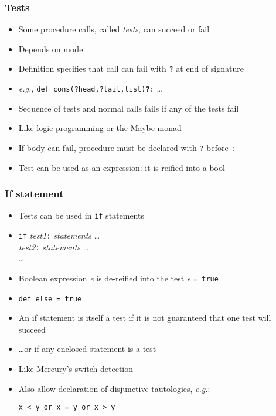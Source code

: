 \documentclass[12pt]{beamer}
\begin{document}
\begin{frame}
\frametitle{Tests}
\begin{itemize}
\item Some procedure calls, called \emph{tests}, can succeed or fail
\item Depends on mode
\item Definition specifies that call can fail with \texttt{?} at end
  of signature
\item \emph{e.g.,} \texttt{def cons(?head,?tail,list)\textbf{?}:} \ldots
\item Sequence of tests and normal calls fails if any of the tests fail
\item Like logic programming or the Maybe monad
\item If body can fail, procedure must be declared with \texttt{?}
  before \texttt{:}
\item Test can be used as an expression:  it is reified into a bool
\end{itemize}
\end{frame}


\begin{frame}
\frametitle{If statement}
\begin{itemize}
\item Tests can be used in \texttt{if} statements
\item \texttt{if} \emph{test1}\texttt{:} \emph{statements} \ldots \\
\hspace*{1em} \emph{test2}\texttt{:} \emph{statements} \ldots \\
\hspace*{1em} \ldots \\
\item Boolean expression \emph{e} is de-reified into the test \emph{e}
  \texttt{= true}
\item \texttt{def else = true}
\item An if statement is itself a test if it is not guaranteed that
  one test will succeed
\item \ldots or if any enclosed statement is a test
\item Like Mercury's switch detection
\item Also allow declaration of disjunctive tautologies, \emph{e.g.}:\\
  \centerline{\texttt{x < y or x = y or x > y}}
\end{itemize}
\end{frame}
\end{document}
